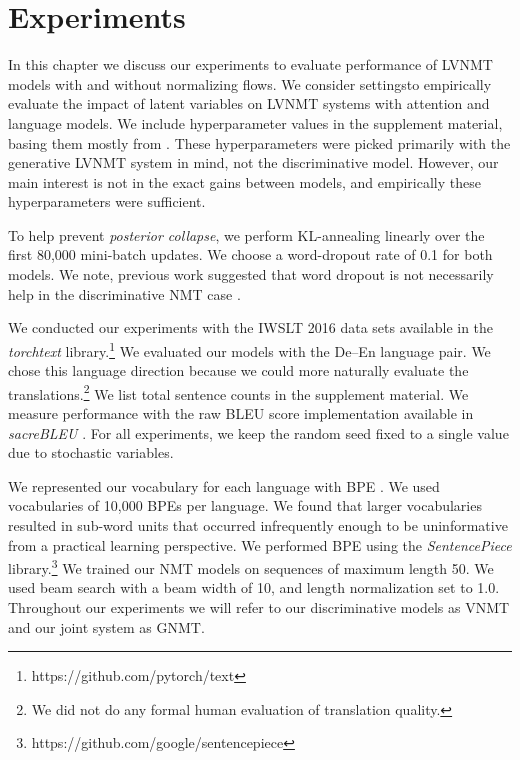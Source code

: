 \chapter{Experiments}

In this chapter we discuss our experiments to evaluate performance of \ac{LVNMT} models with and without normalizing flows. We consider settingsto empirically evaluate the impact of latent variables on \ac{LVNMT} systems with attention and language models. We include hyperparameter values in the supplement material, basing them mostly from \citet{eikema2018AEVNMT}. These hyperparameters were picked primarily with the generative \ac{LVNMT} system in mind, not the discriminative model. However, our main interest is not in the exact gains between models, and empirically these hyperparameters were sufficient.

To help prevent \textit{posterior collapse}, we perform KL-annealing linearly over the first 80,000 mini-batch updates. We choose a word-dropout rate of 0.1 for both models. We note, previous work suggested that word dropout is not necessarily help in the discriminative \ac{NMT} case \cite{harshil2018GNMT}. %

We conducted our experiments with the IWSLT 2016 data sets available in the \textit{torchtext} library.\footnote{https://github.com/pytorch/text} We evaluated our models with the De--En language pair. We chose this language direction because we could more naturally evaluate the translations.\footnote{ We did not do any formal human evaluation of translation quality.} We list total sentence counts in the supplement material. We measure performance with the raw BLEU score implementation available in \textit{sacreBLEU} \cite{post2018SacreBLEU}. For all experiments, we keep the random seed fixed to a single value due to stochastic variables. %

We represented our vocabulary for each language with \ac{BPE} \cite{sennrich2015NMTRarwordsBPE}. We used vocabularies of 10,000 \ac{BPE}s per language. We found that larger vocabularies resulted in sub-word units that occurred infrequently enough to be uninformative from a practical learning perspective. We performed \ac{BPE} using the \textit{SentencePiece} library.\footnote{https://github.com/google/sentencepiece} We trained our \ac{NMT} models on sequences of maximum length 50. We used beam search with a beam width of 10, and length normalization set to 1.0. Throughout our experiments we will refer to our discriminative models as \ac{VNMT} and our joint system as \ac{GNMT}. %


